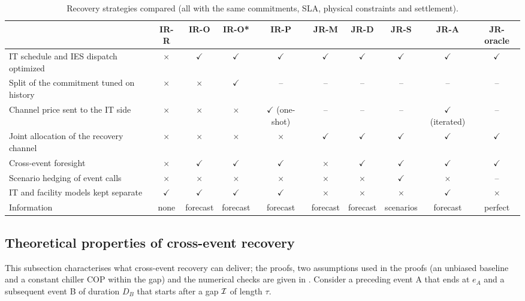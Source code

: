 \begin{table}[!t]
\caption{Recovery strategies compared (all with the same commitments, SLA, physical constraints and settlement).}
\label{tab:strategies}
\centering\footnotesize
\setlength{\tabcolsep}{5.2pt}
\begin{tabular}{@{}lccccccccc@{}}
\toprule
 & IR-R & IR-O & IR-O* & IR-P & JR-M & \textbf{JR-D} & \textbf{JR-S} & \textbf{JR-A} & JR-oracle\\
\midrule
IT schedule and IES dispatch optimized & $\times$ & $\checkmark$ & $\checkmark$ & $\checkmark$ & $\checkmark$ & $\checkmark$ & $\checkmark$ & $\checkmark$ & $\checkmark$\\
Split of the commitment tuned on history & $\times$ & $\times$ & $\checkmark$ & -- & -- & -- & -- & -- & --\\
Channel price sent to the IT side & $\times$ & $\times$ & $\times$ & $\checkmark$ (one-shot) & -- & -- & -- & $\checkmark$ (iterated) & --\\
Joint allocation of the recovery channel & $\times$ & $\times$ & $\times$ & $\times$ & $\checkmark$ & $\checkmark$ & $\checkmark$ & $\checkmark$ & $\checkmark$\\
Cross-event foresight & $\times$ & $\checkmark$ & $\checkmark$ & $\checkmark$ & $\times$ & $\checkmark$ & $\checkmark$ & $\checkmark$ & $\checkmark$\\
Scenario hedging of event calls & $\times$ & $\times$ & $\times$ & $\times$ & $\times$ & $\times$ & $\checkmark$ & $\times$ & --\\
IT and facility models kept separate & $\checkmark$ & $\checkmark$ & $\checkmark$ & $\checkmark$ & $\times$ & $\times$ & $\times$ & $\checkmark$ & $\times$\\
Information & none & forecast & forecast & forecast & forecast & forecast & scenarios & forecast & perfect\\
\bottomrule
\end{tabular}
\end{table}

\subsection{Theoretical properties of cross-event recovery}
\label{sec:theory}

This subsection characterises what cross-event recovery can deliver; the proofs, two assumptions used in the proofs
(an unbiased baseline and a constant chiller COP within the gap) and the numerical checks are given in
. Consider a preceding event A that ends at $e_A$ and a subsequent event B of duration $D_B$ that
starts after a gap $\mathcal{I}$ of length $\tau$.

